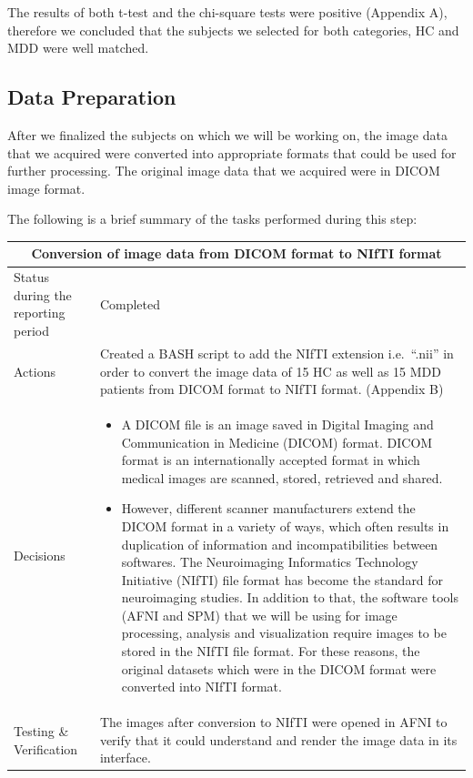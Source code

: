 \documentclass[12pt]{article}
\begin{document}
The results of both t-test and the chi-square tests were positive
(Appendix A), therefore we concluded that the subjects we selected for
both categories, HC and MDD were well matched.

\newpage
\subsection{Data Preparation}%

After we finalized the subjects on which we will be working on, the
image data that we acquired were converted into appropriate formats
that could be used for further processing. The original image data
that we acquired were in DICOM image format.

The following is a brief summary of the tasks performed during this
step:

\begin{table}[H]
  \centering
  \begin{tabular} {| m{3.3cm} | m{11.5cm} | }
    \hline
    \multicolumn{2}{|c|}{Conversion of image data from DICOM format to
    NIfTI format} \\ \hline
    Status during the reporting period   & Completed   \\ \hline
    Actions &
    Created a BASH script to add the NIfTI extension i.e.~``.nii'' in
    order to convert the image data of 15 HC as well as 15 MDD
    patients from DICOM format to NIfTI format. (Appendix B) \\ \hline

    Decisions &
    \begin{itemize}

      \item A DICOM file is an image saved in Digital Imaging and
        Communication in Medicine (DICOM) format.  DICOM format is an
        internationally accepted format in which medical images are
        scanned, stored, retrieved and shared.

      \item However, different scanner manufacturers extend the DICOM
        format in a variety of ways, which often results in
        duplication of information and incompatibilities between
        softwares. The Neuroimaging Informatics Technology Initiative
        (NIfTI) file format has become the standard for neuroimaging
        studies. In addition to that, the software tools (AFNI and
        SPM) that we will be using for image processing, analysis and
        visualization require images to be stored in the NIfTI file
        format. For these reasons, the original datasets which were in
        the DICOM format were converted into NIfTI format.

    \end{itemize} \\ \hline

    Testing \& Verification &
    The images after conversion to NIfTI were opened in AFNI to verify
    that it could understand and render the image data in its
    interface. \\

    \hline

  \end{tabular}
\end{table}
\end{document}
